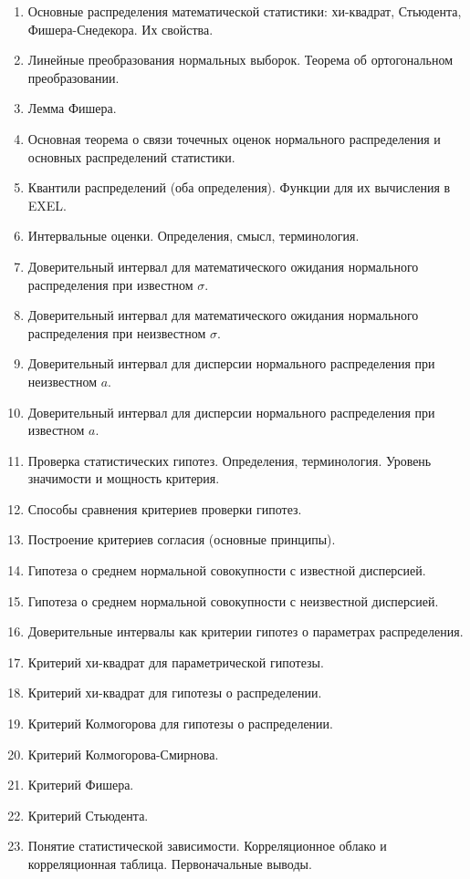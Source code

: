 \documentclass[12pt]{article}
\begin{document}
\begin{enumerate}
    \item Основные распределения математической статистики: хи-квадрат, Стьюдента, Фишера-Снедекора. Их свойства.
    \item Линейные преобразования нормальных выборок. Теорема об ортогональном преобразовании.
    \item Лемма Фишера.
    \item Основная теорема о связи точечных оценок нормального распределения и основных распределений статистики.
    \item Квантили распределений (оба определения). Функции для их вычисления в EXEL.
    \item Интервальные оценки. Определения, смысл, терминология.
    \item Доверительный интервал для математического ожидания нормального распределения при известном $\sigma$.
    \item Доверительный интервал для математического ожидания нормального распределения при неизвестном $\sigma$.
    \item Доверительный интервал для дисперсии нормального распределения при неизвестном $a$.
    \item Доверительный интервал для дисперсии нормального распределения при известном $a$.
    \item Проверка статистических гипотез. Определения, терминология. Уровень значимости и мощность критерия.
    \item Способы сравнения критериев проверки гипотез.
    \item Построение критериев согласия (основные принципы).
    \item Гипотеза о среднем нормальной совокупности с известной дисперсией.
    \item Гипотеза о среднем нормальной совокупности с неизвестной дисперсией.
    \item Доверительные интервалы как критерии гипотез о параметрах распределения.
    \item Критерий хи-квадрат для параметрической гипотезы.
    \item Критерий хи-квадрат для гипотезы о распределении.
    \item Критерий Колмогорова для гипотезы о распределении.
    \item Критерий Колмогорова-Смирнова.
    \item Критерий Фишера.
    \item Критерий Стьюдента.
    \item Понятие статистической зависимости. Корреляционное облако и корреляционная таблица. Первоначальные выводы.

\end{enumerate}
\end{document}
